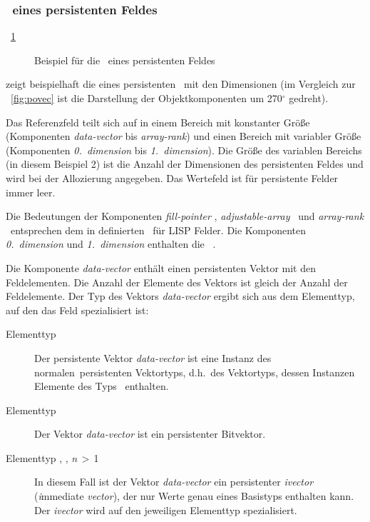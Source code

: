 \subsubsection{\protect\representation\ eines persistenten Feldes}%
%
\figurename~\ref{fig:plexarr} %
%
\begin{figure}[htbp]%
\ifbuch%
\centerline{}%
\else%
\centerline{}%
\fi%
\caption{Beispiel f\"{u}r die \protect\representation\ eines persistenten Feldes}%
\label{fig:plexarr}%
\end{figure}%
%
zeigt beispielhaft die \representation{} eines persistenten
\ mit den Dimensionen  (im Vergleich
zur \figurename~\ref{fig:povec} ist die Darstellung der
Objektkomponenten um 270$^{\circ}$ gedreht).
%
\par{}Das Referenzfeld teilt sich auf in einem
Bereich mit konstanter Gr\"{o}\ss{}e (Komponenten {\em data-vector\/} bis
{\em array-rank\/}) und einen Bereich mit variabler Gr\"{o}\ss{}e
(Komponenten {\em 0.\ dimension\/} bis {\em 1.\ dimension\/}).  Die
Gr\"{o}\ss{}e des variablen Bereichs (in diesem Beispiel 2) ist die Anzahl
der Dimensionen des persistenten Feldes und wird bei der Allozierung
angegeben. Das Wertefeld ist f\"{u}r persistente Felder immer leer.
%
\par{}Die Bedeutungen der Komponenten {\em fill-pointer\/}
, {\em adjustable-array\/} \ und
{\em array-rank\/} \ entsprechen dem in \cite{bib:st90}
definierten \std\ f\"{u}r LISP Felder. Die Komponenten
{\em 0.\ dimension\/} und {\em 1.\ dimension\/} enthalten die
\ .
%
\par Die Komponente {\em data-vector\/} enth\"{a}lt einen persistenten
Vektor mit den Feldelementen. Die Anzahl der Elemente des Vektors ist
gleich der Anzahl der Feldelemente. Der Typ des Vektors {\em
data-vector\/} ergibt sich aus dem Elementtyp, auf den das Feld
spezialisiert ist:
\begin{description}
%
\item[Elementtyp \lispt] Der persistente Vektor {\em
data-vector\/} ist eine Instanz des \rglq{}normalen\rgrq\ persistenten
Vektortyps, d.h.\ des Vektortyps, dessen Instanzen Elemente des Typs
\lispt\ enthalten.
%
\item[Elementtyp ] Der Vektor {\em
data-vector\/}  ist ein persistenter Bitvektor.
%
\item[Elementtyp , ,
{\rm\it n}\,$>$\,1] In diesem Fall ist der Vektor {\em data-vector\/}
ein persistenter {\em ivector\/} ({\em i\/}mmediate {\em vector\/}),
der nur Werte genau eines Basistyps enthalten kann. Der {\em ivector\/}
wird auf den jeweiligen Elementtyp spezialisiert.
%
\end{description}
